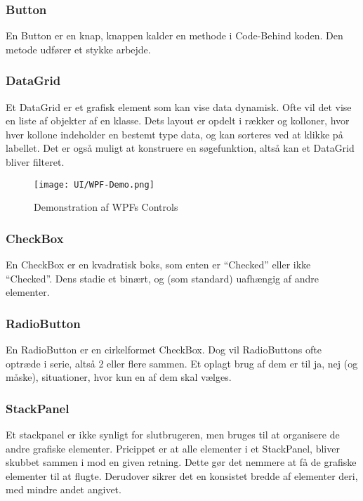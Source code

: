 \subsubsection{Button}
En Button er en knap, knappen kalder en methode i Code-Behind koden. 
Den metode udfører et stykke arbejde.

\subsubsection{DataGrid}
Et DataGrid er et grafisk element som kan vise data dynamisk.
Ofte vil det vise en liste af objekter af en klasse.
Dets layout er opdelt i rækker og kolloner, hvor hver kollone indeholder en bestemt type data, og kan sorteres ved at klikke på labellet.
Det er også muligt at konstruere en søgefunktion, altså kan et DataGrid bliver filteret.

\begin{wrapfigure}[22]{R}{0.5\textwidth}
    \label{img:wpfdemo}
    \vspace{-30pt}
    \begin{center}
        \texttt{[image: UI/WPF-Demo.png]}
    \end{center}
    \vspace{-15pt}
    \caption{Demonstration af WPFs Controls}
\end{wrapfigure}

\subsubsection{CheckBox}
En CheckBox er en kvadratisk boks, som enten er ``Checked'' eller ikke ``Checked''. 
Dens stadie et binært, og (som standard) uafhængig af andre elementer.

\subsubsection{RadioButton}
En RadioButton er en cirkelformet CheckBox.
Dog vil RadioButtons ofte optræde i serie, altså 2 eller flere sammen.
Et oplagt brug af dem er til ja, nej (og måske), situationer, hvor kun en af dem skal vælges.

\subsubsection{StackPanel}
Et stackpanel er ikke synligt for slutbrugeren, men bruges til at organisere de andre grafiske elementer.
Pricippet er at alle elementer i et StackPanel, bliver skubbet sammen i mod en given retning.
Dette gør det nemmere at få de grafiske elementer til at flugte.
Derudover sikrer det en konsistet bredde af elementer deri, med mindre andet angivet.

